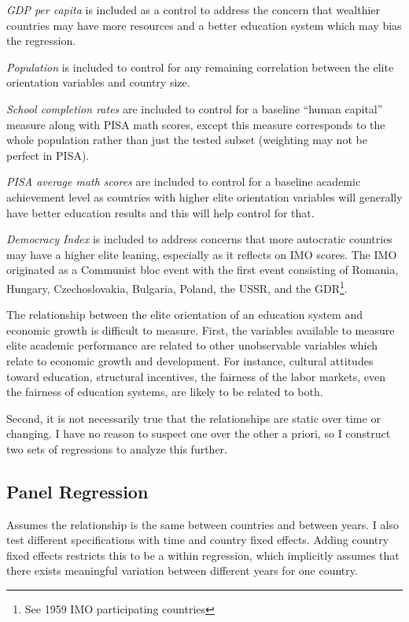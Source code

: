 \documentclass[11pt]{article}
\begin{document}
\textit{GDP per capita} is included as a control to address the concern that wealthier countries may have more resources and a better education system which may bias the regression.

\textit{Population} is included to control for any remaining correlation between the elite orientation variables and country size.

\textit{School completion rates} are included to control for a baseline “human capital” measure along with PISA math scores, except this measure corresponds to the whole population rather than just the tested subset (weighting may not be perfect in PISA).

\textit{PISA average math scores} are included to control for a baseline academic achievement level as countries with higher elite orientation variables will generally have better education results and this will help control for that.

\textit{Democracy Index} is included to address concerns that more autocratic countries may have a higher elite leaning, especially as it reflects on IMO scores. The IMO originated as a Communist bloc event with the first event consisting of Romania, Hungary, Czechoslovakia, Bulgaria, Poland, the USSR, and the GDR\footnote{See 1959 IMO participating countries}.

The relationship between the elite orientation of an education system and economic growth is difficult to measure. First, the variables available to measure elite academic performance are related to other unobservable variables which relate to economic growth and development. For instance, cultural attitudes toward education, structural incentives, the fairness of the labor markets, even the fairness of education systems, are likely to be related to both.

Second, it is not necessarily true that the relationships are static over time or changing. I have no reason to suspect one over the other a priori, so I construct two sets of regressions to analyze this further.

\subsection{Panel Regression}
Assumes the relationship is the same between countries and between years. I also test different specifications with time and country fixed effects. Adding country fixed effects restricts this to be a within regression, which implicitly assumes that there exists meaningful variation between different years for one country.
\end{document}
